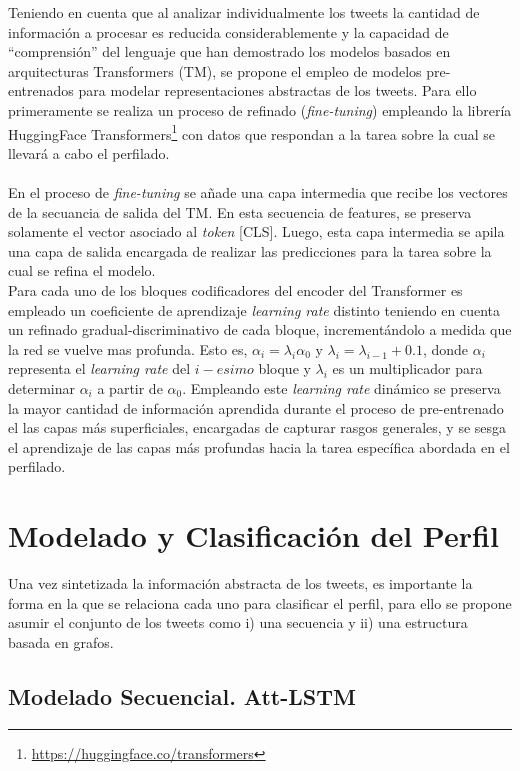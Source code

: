 	Teniendo en cuenta que al analizar individualmente los tweets la cantidad de información a procesar es reducida considerablemente y la capacidad de ``comprensión'' del lenguaje que han demostrado los modelos basados en arquitecturas Transformers (TM), se propone el empleo de modelos pre-entrenados para modelar representaciones abstractas de los tweets. Para ello primeramente se realiza un proceso de refinado (\textit{fine-tuning}) empleando la librería HuggingFace Transformers\footnote{\url{https://huggingface.co/transformers}} con datos que respondan a la tarea sobre la cual se llevará a cabo el perfilado. 
	\\\\
	En el proceso de \textit{fine-tuning} se añade una capa intermedia que recibe los vectores de la secuancia de salida del TM. En esta secuencia de features, se preserva solamente el vector asociado al \textit{token} [CLS]. Luego, esta capa intermedia se apila una capa de salida encargada de realizar las predicciones para la tarea sobre la cual  se refina el modelo.
	\\
	Para cada uno de los bloques codificadores del encoder del Transformer es empleado un coeficiente de aprendizaje \textit{learning rate} distinto teniendo en cuenta un refinado gradual-discriminativo de cada bloque, incrementándolo a medida que la red se vuelve mas profunda. Esto es, $\alpha_i = \lambda_i \alpha_0 \text{ y } \lambda_i = \lambda_{i-1} + 0\text{.}1$, donde $\alpha_i$ representa el \textit{learning rate} del $i-esimo$ bloque y $\lambda_i$ es un multiplicador para determinar $\alpha_i$ a partir de $\alpha_0$. Empleando este \textit{learning rate} dinámico se preserva la mayor cantidad de información aprendida durante el proceso de pre-entrenado el las capas más superficiales, encargadas de capturar rasgos generales, y se sesga el aprendizaje de las capas más profundas hacia la tarea específica abordada en el perfilado.
	\section{Modelado  y Clasificación del Perfil}
	
	Una vez sintetizada la información abstracta de los tweets, es importante la forma en la que se relaciona cada uno para clasificar el perfil, para ello se propone asumir el conjunto de los tweets como i) una secuencia y ii) una estructura basada en grafos.
	
	\subsection{Modelado Secuencial. Att-LSTM}\label{att-lstm}
	
